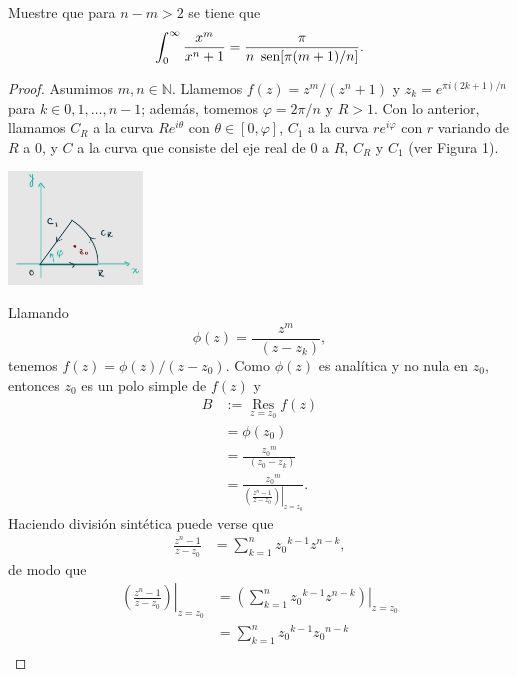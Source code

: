 \begin{Ejc}
   Muestre que para $n-m>2$ se tiene que $$\int_{0}^{\infty}\frac{x^m}{x^n+1}=\frac{\pi}{n \phantom{o}\sen[\pi(m+1)/n]}.$$
\end{Ejc}
\begin{proof}
   Asumimos $m,n\in\mathbb{N}$. Llamemos $f(z)=z^m/(z^n+1)$ y $z_k=e^{\pi i (2k+1)/n}$ para $k\in{0,1,\dots,n-1}$; además, tomemos $\varphi=2\pi/n$ y $R>1$. Con lo anterior, llamamos $C_R$ a la curva $Re^{i\theta}$ con $\theta\in[0,\varphi]$, $C_1$ a la curva $re^{i\varphi}$ con $r$ variando de $R$ a $0$, y $C$ a la curva que consiste del eje real de $0$ a $R$, $C_R$ y $C_1$ (ver Figura 1).\\
   \begin{center}
       \includegraphics[height=3cm]{Diag1.jpeg}\\
   \end{center}
   Llamando
   $$
   \phi(z)=\frac{z^m}{\mathop{\prod\limits_{0<k\leq n-1}}(z-z_k)},
   $$
   tenemos $f(z)=\phi(z)/(z-z_0)$. Como $\phi(z)$ es analítica y no nula en $z_0$, entonces $z_0$ es un polo simple de $f(z)$ y
   $$
   \begin{aligned}
      B&:=\mathop{\mathrm{Res}}\limits_{z=z_0}f(z)\\
       &=\phi(z_0)\\
       &=\frac{{z_0}^m}{\mathop{\prod\limits_{0<k\leq n-1}}(z_0-z_k)}\\
       &=\frac{{z_0}^m}{\left.\left( \frac{z^n-1}{z-z_0}\right)\right|_{z=z_0}}.
   \end{aligned}
   $$
   Haciendo división sintética puede verse que
   $$
   \begin{aligned}
      \frac{z^n-1}{z-z_0}&=\sum_{k=1}^{n}{z_0}^{k-1}z^{n-k},
   \end{aligned}
   $$
   de modo que
   $$
   \begin{aligned}
      \left.\left( \frac{z^n-1}{z-z_0}\right)\right|_{z=z_0}&=\left.\left( \sum_{k=1}^{n}{z_0}^{k-1}z^{n-k}\right)\right|_{z=z_0}\\
                                                            &=\sum_{k=1}^{n}{z_0}^{k-1}{z_0}^{n-k}\\

\end{aligned}$$
\end{proof}
